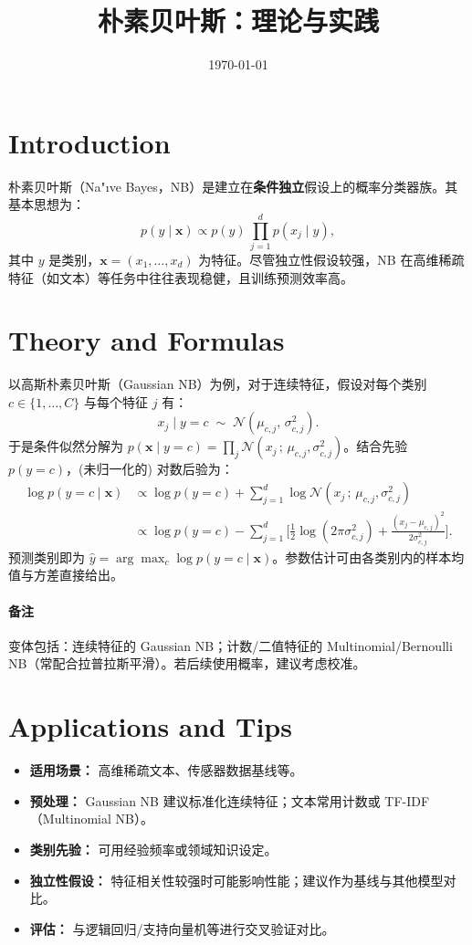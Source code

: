 \documentclass[11pt]{article}
\title{朴素贝叶斯：理论与实践}
\author{}
\date{\today}
\begin{document}
\maketitle

\section{Introduction}
朴素贝叶斯（Na"\i ve Bayes，NB）是建立在\textbf{条件独立}假设上的概率分类器族。其基本思想为：
\begin{equation}
 p(y\mid \mathbf{x}) \propto p(y)\,\prod_{j=1}^{d} p(x_j \mid y),
\end{equation}
其中 $y$ 是类别，$\mathbf{x}=(x_1,\dots,x_d)$ 为特征。尽管独立性假设较强，NB 在高维稀疏特征（如文本）等任务中往往表现稳健，且训练预测效率高。

\section{Theory and Formulas}
以高斯朴素贝叶斯（Gaussian NB）为例，对于连续特征，假设对每个类别 $c\in\{1,\dots,C\}$ 与每个特征 $j$ 有：
\begin{equation}
 x_j \mid y=c \;\sim\; \mathcal{N}(\mu_{c,j},\, \sigma^2_{c,j}).
\end{equation}
于是条件似然分解为 $p(\mathbf{x}\mid y=c)=\prod_{j} \mathcal{N}(x_j\,;\,\mu_{c,j},\sigma^2_{c,j})$。结合先验 $p(y=c)$，(未归一化的) 对数后验为：
\begin{align}
 \log p(y=c\mid \mathbf{x}) 
 &\propto \log p(y=c) + \sum_{j=1}^d \log \mathcal{N}(x_j\,;\,\mu_{c,j},\sigma^2_{c,j})\\
 &\propto \log p(y=c) - \sum_{j=1}^d \Big[ \tfrac{1}{2}\log (2\pi\sigma^2_{c,j}) + \tfrac{(x_j-\mu_{c,j})^2}{2\sigma^2_{c,j}} \Big].
\end{align}
预测类别即为 $\hat y = \arg\max_c \log p(y=c\mid \mathbf{x})$。参数估计可由各类别内的样本均值与方差直接给出。

\paragraph{备注} 变体包括：连续特征的 Gaussian NB；计数/二值特征的 Multinomial/Bernoulli NB（常配合拉普拉斯平滑）。若后续使用概率，建议考虑校准。

\section{Applications and Tips}
\begin{itemize}
  \item \textbf{适用场景：} 高维稀疏文本、传感器数据基线等。
  \item \textbf{预处理：} Gaussian NB 建议标准化连续特征；文本常用计数或 TF-IDF（Multinomial NB）。
  \item \textbf{类别先验：} 可用经验频率或领域知识设定。
  \item \textbf{独立性假设：} 特征相关性较强时可能影响性能；建议作为基线与其他模型对比。
  \item \textbf{评估：} 与逻辑回归/支持向量机等进行交叉验证对比。
\end{itemize}
\end{document}

